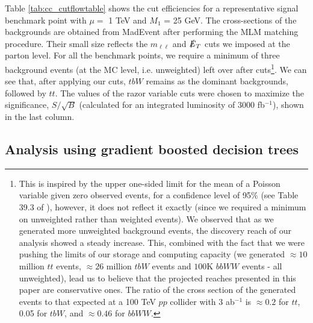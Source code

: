 \documentclass[a4paper,11pt]{article}
\begin{document}
Table \ref{tab:cc_cutflowtable} shows the cut efficiencies for a representative
signal benchmark point with $\mu =$ 1 TeV and $M_1$ = 25 GeV.   The
cross-sections of the backgrounds are obtained from MadEvent after performing
the MLM matching procedure. Their small size reflects the $m_{\ell\ell}$ and
$\slashed{E}_T$ cuts we imposed at the parton level. For all the benchmark
points, we require a minimum of three background events (at the MC level, i.e.
unweighted) left over after cuts\footnote{This is inspired by the upper
    one-sided limit for the mean of a Poisson variable given zero observed
    events, for a confidence level of 95\% (see Table 39.3 of
    \cite{PhysRevD.98.030001}), however, it does not reflect it exactly (since
    we required a minimum on unweighted rather than weighted events).  We
    observed that as we generated more unweighted background events, the
    discovery reach of our analysis showed a steady increase. This, combined
    with the fact that we were pushing the limits of our storage and computing
    capacity (we generated $\approx 10$ million $tt$ events, $\approx 26$
    million $tbW$  events and $100$K $bbWW$ events - all unweighted), lead us
    to believe that the projected reaches presented in this paper are
conservative ones. The ratio of the cross section of the generated events to
that expected at a 100 TeV $pp$ collider with 3 ab$^{-1}$ is $\approx 0.2$ for
$tt$, 0.05 for $tbW$, and $\approx0.46$ for $bbWW$.}. We can see that, after applying our
cuts, $tbW$ remains as the dominant backgrounds, followed by $tt$.  The values
of the razor variable cuts were chosen to maximize the significance,
$S/\sqrt{B}$ (calculated for an integrated luminosity of 3000 fb$^{-1}$), shown
in the last column.  

\subsection{Analysis using gradient boosted decision trees}\label{subsec:bdt}
\end{document}

